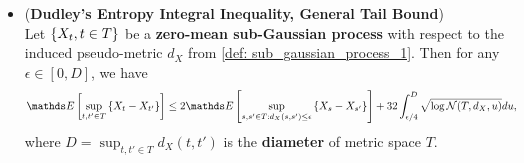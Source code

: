 \documentclass[11pt]{article}
\begin{document}
\begin{itemize}
\item \begin{theorem} (\textbf{Dudley's Entropy Integral Inequality, General Tail Bound}) \citep{wainwright2019high}\\
Let $\left\{X_{t}, t \in T\right\}$ be a \textbf{zero-mean sub-Gaussian process}  with respect to the induced pseudo-metric $d_X$ from \eqref{def: sub_gaussian_process_1}. Then for any $\epsilon \in [0, D]$,  we have
\begin{align}
\E{}{\sup_{t, t' \in T}\set{X_t - X_{t'}}} &\le 2\E{}{\sup_{s, s' \in T: d_X(s, s') \le \epsilon}\set{X_s - X_{s'}}} + 32 \int_{\epsilon/4}^{D}\sqrt{\log \cN(T, d_{X}, u)} du, \label{ineqn: dudley_metric_entropy_integral_inequality_tail_difference_general}
\end{align} where $D  = \sup_{t, t'\in T}d_{X}(t, t')$ is the \textbf{diameter} of metric space $T$.
\end{theorem}
\end{itemize}
\end{document}

